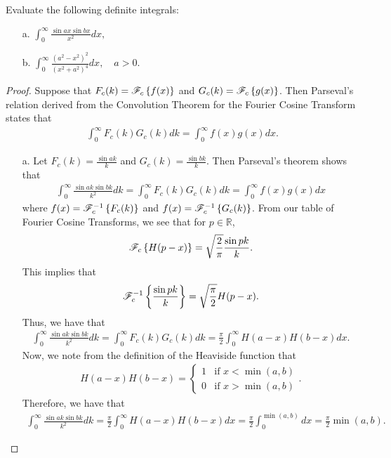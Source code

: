 \begin{problem}{6}
  Evaluate the following definite integrals:
  \begin{enumerate}
    \item[a.] $\displaystyle \int_0^\infty \frac{\sin ax \sin bx}{x^2} dx,$
    \item[b.] $\displaystyle \int_0^\infty \frac{(a^2 - x^2)^2}{(x^2+a^2)^4} dx, \quad a >0$.
  \end{enumerate}
\end{problem}

\begin{proof}
  Suppose that $F_c(k) = \mathscr{F}_c\left\{ {f(x)} \right\}$ and $G_c(k) = \mathscr{F}_c\left\{ {g(x)} \right\}$. Then Parseval's
  relation derived from the Convolution Theorem for the Fourier Cosine Transform states
  that
  \begin{align}\label{parseval}
    \int_{0}^\infty F_c(k)G_c(k) dk = \int_0^\infty f(x)g(x) dx.
  \end{align}
  \begin{enumerate}
    \item[a.] Let $\displaystyle F_c(k) = \frac{\sin a k}{k}$ and $\displaystyle G_c(k) = \frac{\sin b k}{k}$.
      Then Parseval's theorem shows that
      \begin{align*}
        \int_0^\infty \frac{\sin ak \sin bk}{k^2} dk = \int_0^\infty F_c(k)G_c(k)dk = \int_0^\infty f(x)g(x)dx
      \end{align*}
      where $f(x) = \mathscr{F}_c^{-1}\left\{ {F_c(k)} \right\}$ and $f(x) = \mathscr{F}_c^{-1}\left\{ {G_c(k)} \right\}$. From our table
      of Fourier Cosine Transforms, we see that for $p\in\mathbb{R}$,
      \begin{align*}
        \mathscr{F}_c\left\{ {H(p-x)} \right\} = \sqrt{\frac{2}{\pi}}\frac{\sin p k }{k}.
      \end{align*}
      This implies that
      \begin{align*}
        \mathscr{F}_c^{-1}\left\{ {\frac{\sin p k }{k}} \right\} = \sqrt{\frac{\pi}{2}}H(p-x).
      \end{align*}
      Thus, we have that
      \begin{align*}
        \int_0^\infty \frac{\sin ak \sin bk}{k^2} dk = \int_0^\infty F_c(k)G_c(k)dk = \frac{\pi}{2}\int_0^\infty H(a-x)H(b-x)dx.
      \end{align*}
      Now, we note from the definition of the Heaviside function that
      \begin{align*}
        H(a-x)H(b-x) = \begin{cases}1 & \text{if $x<\min(a,b)$} \\
        0 & \text{if $x>\min(a,b)$} \end{cases}.
      \end{align*}
      Therefore, we have that
      \begin{align*}
        \int_0^\infty \frac{\sin ak \sin bk}{k^2} dk = \frac{\pi}{2}\int_0^\infty H(a-x)H(b-x)dx = \frac{\pi}{2}\int_0^{\min(a,b)}dx = \frac{\pi}{2}\min(a,b).
      \end{align*}


\end{enumerate}
\end{proof}
